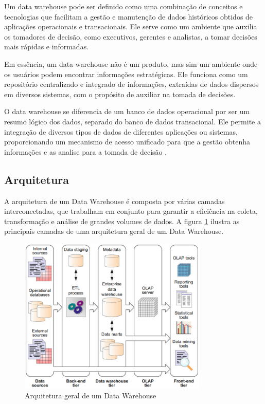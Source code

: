 Um data warehouse pode ser definido como uma combinação de conceitos e tecnologias que facilitam a gestão e manutenção 
de dados históricos obtidos de aplicações operacionais e transacionais. Ele serve como um ambiente que auxilia os tomadores 
de decisão, como executivos, gerentes e analistas, a tomar decisões mais rápidas e informadas.

Em essência, um data warehouse não é um produto, mas sim um ambiente onde os usuários podem encontrar informações estratégicas. 
Ele funciona como um repositório centralizado e integrado de informações, extraídas de dados dispersos em diversos sistemas, 
com o propósito de auxiliar na tomada de decisões.

O data warehouse se diferencia de um banco de dados operacional por ser um resumo lógico dos dados, separado do banco de 
dados transacional. Ele permite a integração de diversos tipos de dados de diferentes aplicações ou sistemas, proporcionando 
um mecanismo de acesso unificado para que a gestão obtenha informações e as analise para a tomada de decisão \cite{santoso2017data}. 

\subsection{Arquitetura}
A arquitetura de um Data Warehouse é composta por várias camadas interconectadas, que trabalham em conjunto para 
garantir a eficiência na coleta, transformação e análise de grandes volumes de dados. A figura \ref{fig:arquitetura_dw} ilustra as 
principais camadas de uma arquitetura geral de um Data Warehouse.

\begin{figure}[h]
    \centering
    \includegraphics[width=0.8\textwidth]{figuras/typical_data_warehouse_architecture.eps}
    \caption{Arquitetura geral de um Data Warehouse}
    \label{fig:arquitetura_dw}
\end{figure}

